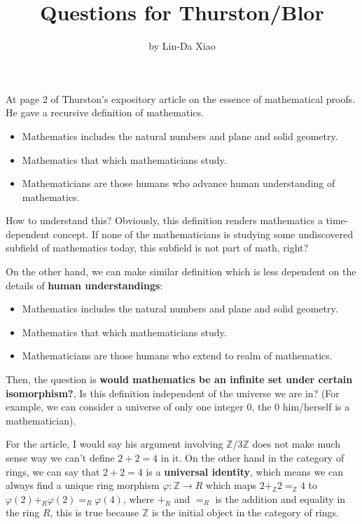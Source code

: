 \documentclass[11pt]{article}
\title{\bf Questions for Thurston/Blor}
\author{by Lin-Da Xiao} %
\newcommand{\intg}{\mathbb Z}
\begin{document}
\maketitle
At page 2 of Thurston's expository article on the essence of mathematical proofs. He gave a recursive definition of mathematics.
\begin{itemize}
\item Mathematics includes the natural numbers and plane and solid geometry.
\item Mathematics that which mathematicians study.
\item Mathematicians are those humans who advance human understanding of mathematics.  
\end{itemize}  
How to understand this? Obviously, this definition renders mathematics a time-dependent concept. If none of the mathematicians is studying some undiscovered subfield of mathematics today, this subfield is not part of math, right? 

On the other hand, we can make similar definition which is less dependent on the details of \textbf{human understandings}:
\begin{itemize}
\item Mathematics includes the natural numbers and plane and solid geometry.
\item Mathematics that which mathematicians study.
\item Mathematicians are those humans who extend to realm of mathematics.  
\end{itemize}
Then, the question is \textbf{would mathematics be an infinite set under certain isomorphism?}, Is this definition independent of the universe we are in? (For example, we can consider a universe of only one integer $0$, the $0$ him/herself is a mathematician).

For the article, I would say his argument involving $\intg/3\intg$ does not make much sense way we can't define $2+2=4$ in it. On the other hand  in the category of rings, we can say that $2+2=4$ is a \textbf{universal identity}, which means we can always find a unique ring morphism $\varphi:\intg\rightarrow R$ which maps $2+_\intg2=_\intg4$ to $\varphi(2)+_R\varphi(2)=_R\varphi(4)$, where $+_R$ and $=_R$ is the addition and equality in the ring $R$, this is true because $\intg$ is the initial object in the category of rings.
\end{document}
